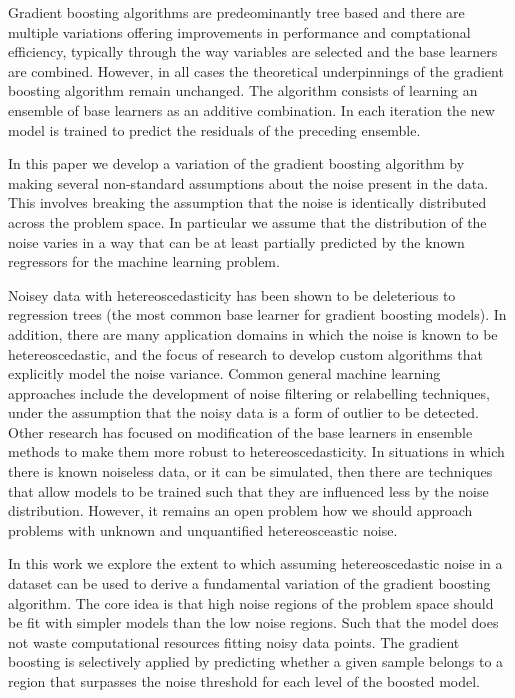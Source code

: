 \documentclass[12pt,a4paper]{article}
\begin{document}
Gradient boosting algorithms are predeominantly tree based and there are multiple variations 
offering improvements in performance and comptational efficiency, typically through the way variables
are selected and the base learners are combined\cite{Ke2017}.
However, in all cases the theoretical underpinnings of the gradient boosting algorithm
remain unchanged. The algorithm consists of learning an ensemble of base learners
as an additive combination. In each iteration the new model is trained to predict the
residuals of the preceding ensemble\cite{Friedman2000,Friedman2001,Friedman2002}. 

In this paper we develop a variation of the gradient boosting algorithm by making
several non-standard assumptions about the noise present in the data.
This involves breaking the assumption that the noise is identically distributed across the
problem space. In particular we assume that the distribution of the noise varies in a way that
can be at least partially predicted by the known regressors for the machine learning problem.

Noisey data with hetereoscedasticity has been shown to be deleterious to regression trees (the most
common base learner for gradient boosting models)\cite{ruth2016effect}. In addition, there are
many application domains in which the noise is known to be hetereoscedastic, and the focus of
research to develop custom algorithms that explicitly model the noise variance\cite{Zhenxing2020,Zhang2023}. 
Common general machine learning approaches include the development
of noise filtering or relabelling techniques, under the assumption that the noisy data is a form
of outlier to be detected\cite{Ustinovskiy2016}. Other research has focused on modification of the base learners in
ensemble methods to make them more robust to hetereoscedasticity\cite{Henrey2016}. In situations in which
there is known noiseless data, or it can be simulated, then there are techniques that allow models to
be trained such that they are influenced less by the noise distribution\cite{Wu2021}. However, it remains
an open problem how we should approach problems with unknown and unquantified hetereosceastic noise.

In this work we explore the extent to which assuming hetereoscedastic noise in a dataset can be used
to derive a fundamental variation of the gradient boosting algorithm. 
The core idea is that high noise regions of the problem space should be fit with simpler
models than the low noise regions. Such that the model does not waste computational resources fitting
noisy data points. The gradient boosting is selectively applied by predicting whether a given sample
belongs to a region that surpasses the noise threshold for each level of the boosted model.
\end{document}
